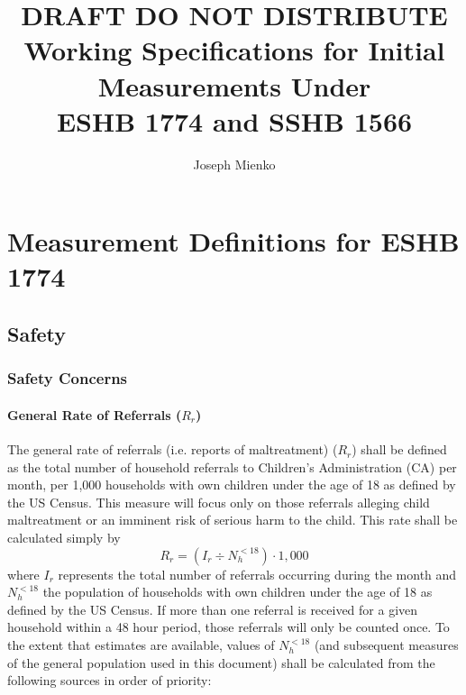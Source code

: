 \documentclass[12pt]{article}\usepackage[]{graphicx}\usepackage[]{color}
\title{DRAFT DO NOT DISTRIBUTE\\
      Working Specifications for Initial Measurements Under \\
      ESHB 1774 and SSHB 1566}
\author{Joseph Mienko\inst{1}}
\begin{document}

 

        


   
\maketitle

\section{Measurement Definitions for ESHB 1774}
\subsection{Safety}
\subsubsection{Safety Concerns}
\paragraph{General Rate of Referrals ($R_r$)}

The general rate of referrals (i.e. reports of maltreatment) ($R_r$) shall be defined as the total number of household referrals to Children's Administration (CA) per month, per 1,000 households with own children under the age of 18 as defined by the US Census. This measure will focus only on those referrals alleging child maltreatment or an imminent risk of serious harm to the child. This rate shall be calculated simply by 
\begin{equation}\label{eq:Rr}
R_r = (I_r \div N_{h}^{<18}) \cdot 1,000
\end{equation}
where $I_r$ represents the total number of referrals occurring during the month and $N_{h}^{<18}$ the population of households with own children under the age of 18 as defined by the US Census. If more than one referral is received for a given household within a 48 hour period, those referrals will only be counted once. To the extent that estimates are available, values of $N_{h}^{<18}$ (and subsequent measures of the general population used in this document) shall be calculated from the following sources in order of priority:
\end{document}
